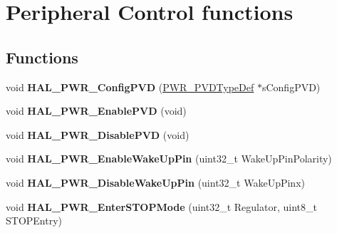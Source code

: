 \hypertarget{group___p_w_r___exported___functions___group2}{}\section{Peripheral Control functions}
\label{group___p_w_r___exported___functions___group2}
\subsection*{Functions}
\begin{DoxyCompactItemize}
\item 
\mbox{\label{group___p_w_r___exported___functions___group2_ga87e59191de350b0942847624ddbe6d9d}} 
void {\bfseries H\+A\+L\+\_\+\+P\+W\+R\+\_\+\+Config\+P\+VD} (\mbox{\hyperlink{struct_p_w_r___p_v_d_type_def}{P\+W\+R\+\_\+\+P\+V\+D\+Type\+Def}} $\ast$s\+Config\+P\+VD)
\item 
\mbox{\label{group___p_w_r___exported___functions___group2_ga729c254eac1847073d8a55621384107d}} 
void {\bfseries H\+A\+L\+\_\+\+P\+W\+R\+\_\+\+Enable\+P\+VD} (void)
\item 
\mbox{\label{group___p_w_r___exported___functions___group2_ga3a843cc2fd1a1bb02c7f2dfa355bf9ec}} 
void {\bfseries H\+A\+L\+\_\+\+P\+W\+R\+\_\+\+Disable\+P\+VD} (void)
\item 
\mbox{\label{group___p_w_r___exported___functions___group2_gab821ac9058a5feb78491bff15d9ae591}} 
void {\bfseries H\+A\+L\+\_\+\+P\+W\+R\+\_\+\+Enable\+Wake\+Up\+Pin} (uint32\+\_\+t Wake\+Up\+Pin\+Polarity)
\item 
\mbox{\label{group___p_w_r___exported___functions___group2_gab12ca816929e23e36f5ed8f4ccdb1472}} 
void {\bfseries H\+A\+L\+\_\+\+P\+W\+R\+\_\+\+Disable\+Wake\+Up\+Pin} (uint32\+\_\+t Wake\+Up\+Pinx)
\item 
\mbox{\label{group___p_w_r___exported___functions___group2_gacfca5f1062274423e08317c0a5a225fa}} 
void {\bfseries H\+A\+L\+\_\+\+P\+W\+R\+\_\+\+Enter\+S\+T\+O\+P\+Mode} (uint32\+\_\+t Regulator, uint8\+\_\+t S\+T\+O\+P\+Entry)

\end{DoxyCompactItemize}
